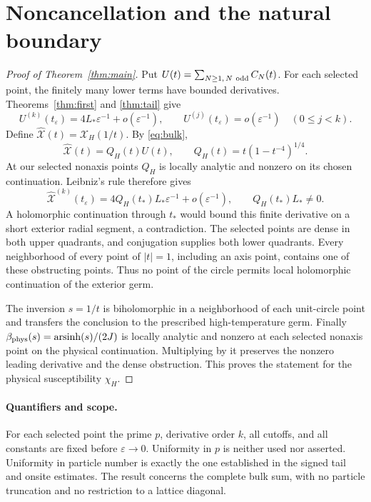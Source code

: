 \documentclass[11pt]{article}
\numberwithin{equation}{section}
\theoremstyle{definition}
\newcommand{\eps}{\varepsilon}
\begin{document}
\section{Noncancellation and the natural boundary}
\begin{proof}[Proof of Theorem~\ref{thm:main}]
Put $U(t)=\sum_{N\ge1,\,N\ {\rm odd}}C_N(t)$. For each selected
point, the finitely many lower terms have bounded derivatives.
Theorems~\ref{thm:first} and \ref{thm:tail} give
\[
 U^{(k)}(t_\eps)=4L_*\eps^{-1}+o(\eps^{-1}),
 \qquad U^{(j)}(t_\eps)=o(\eps^{-1})\quad(0\le j<k).
\]
Define $\widehat{\mathcal X}(t)=\mathcal X_H(1/t)$.
By \eqref{eq:bulk},
\[
 \widehat{\mathcal X}(t)=Q_H(t)U(t),\qquad
 Q_H(t)=t(1-t^{-4})^{1/4}.
\]
At our selected nonaxis points $Q_H$ is locally analytic and
nonzero on its chosen continuation. Leibniz's rule therefore gives
\[
 \widehat{\mathcal X}^{(k)}(t_\eps)
 =4Q_H(t_*)L_*\eps^{-1}+o(\eps^{-1}),
 \qquad Q_H(t_*)L_*\ne0.
\]
A holomorphic continuation through $t_*$ would bound this finite
derivative on a short exterior radial segment, a contradiction.
The selected points are dense in both upper quadrants, and
conjugation supplies both lower quadrants. Every neighborhood of
every point of $|t|=1$, including an axis point, contains one of
these obstructing points. Thus no point of the circle permits
local holomorphic continuation of the exterior germ.

The inversion $s=1/t$ is biholomorphic in a neighborhood of each
unit-circle point and transfers the conclusion to the prescribed
high-temperature germ. Finally
$\beta_{\rm phys}(s)=\operatorname{arsinh}(s)/(2J)$ is locally
analytic and nonzero at each selected nonaxis point on the
physical continuation. Multiplying by it preserves the nonzero
leading derivative and the dense obstruction. This proves the
statement for the physical susceptibility $\chi_H$.
\end{proof}

\paragraph{Quantifiers and scope.}
For each selected point the prime $p$, derivative order $k$, all
cutoffs, and all constants are fixed before $\eps\to0$. Uniformity
in $p$ is neither used nor asserted. Uniformity in particle number
is exactly the one established in the signed tail and onsite
estimates. The result concerns the complete bulk sum, with no
particle truncation and no restriction to a lattice diagonal.
\end{document}
